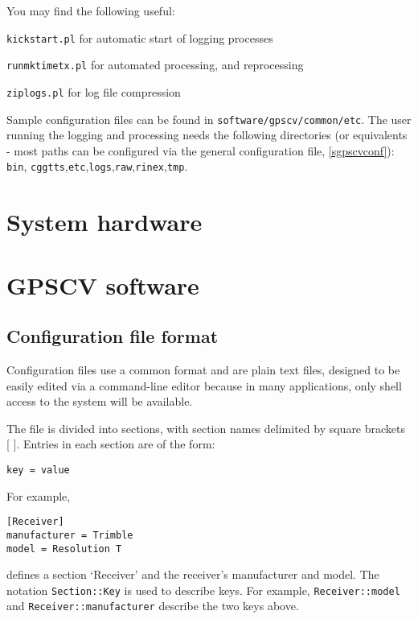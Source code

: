 \documentclass[11pt,a4paper,openany,oneside]{book}
\newcommand{\cc}[1]{{\texttt{#1}}}
\newenvironment{description*}%
  {\setlength{\parskip}{0pt}%
	 \begin{description}%
		\setlength{\topsep}{-12pt}%
		\setlength{\itemindent}{-12pt}%
    \setlength{\itemsep}{0pt}%
		\setlength{\itemsep}{0pt}}%
  {\end{description}}
\begin{document}
You may find the following useful:
\begin{description*}
	\item[] \cc{kickstart.pl} for automatic start of logging processes
	\item[] \cc{runmktimetx.pl} for automated processing, and reprocessing
	\item[] \cc{ziplogs.pl} for log file compression
\end{description*}	

Sample configuration files can be found in \cc{software/gpscv/common/etc}.
The user running the logging and processing needs the following directories (or equivalents - most paths
can be configured via the general configuration file, \ref{sgpscvconf}):
\cc{bin}, \cc{cggtts},\cc{etc},\cc{logs},\cc{raw},\cc{rinex},\cc{tmp}.

\chapter{System hardware}




\chapter{GPSCV software}

\section{Configuration file format \label{sConfigFileFormat}}

Configuration files use a common format and are plain text files, designed to be easily edited via a command-line
editor because in many applications, only shell access to the system will be available.

The file is divided into sections, with section names delimited by square brackets [ ]. Entries in each section
are of the form:
\begin{lstlisting}
key = value
\end{lstlisting}
For example,
\begin{lstlisting}
[Receiver]
manufacturer = Trimble
model = Resolution T
\end{lstlisting}
defines a section `Receiver' and the receiver's manufacturer and model. 
The notation \cc{Section::Key} is used to describe keys. For example,
\cc{Receiver::model} and \cc{Receiver::manufacturer} describe the two keys above.
\end{document}
